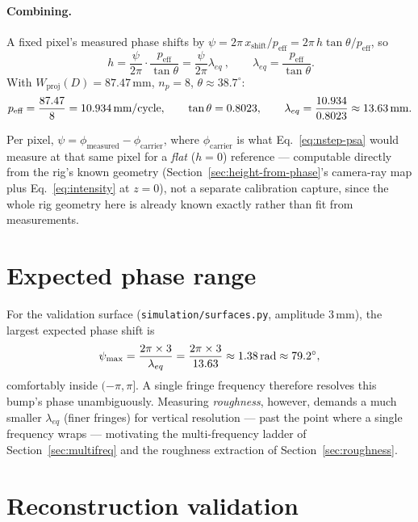 \documentclass[11pt]{article}
\begin{document}
\paragraph{Combining.} A fixed pixel's measured phase shifts by
$\psi = 2\pi\,x_{\text{shift}}/p_{\text{eff}} = 2\pi\,h\tan\theta/p_{\text{eff}}$,
so
\begin{equation}
  \boxed{\ h = \frac{\psi}{2\pi}\cdot\frac{p_{\text{eff}}}{\tan\theta} = \frac{\psi}{2\pi}\lambda_{eq}\ },
  \qquad \lambda_{eq} = \frac{p_{\text{eff}}}{\tan\theta}.
  \label{eq:height-from-phase}
\end{equation}
With $W_{\text{proj}}(D) = 87.47$\,mm, $n_p = 8$, $\theta \approx 38.7^\circ$:
\begin{equation}
  p_{\text{eff}} = \frac{87.47}{8} = 10.934\text{\,mm/cycle}, \qquad
  \tan\theta = 0.8023, \qquad
  \lambda_{eq} = \frac{10.934}{0.8023} \approx 13.63\text{\,mm}.
\end{equation}

Per pixel, $\psi = \phi_{\text{measured}} - \phi_{\text{carrier}}$, where
$\phi_{\text{carrier}}$ is what Eq.~\ref{eq:nstep-psa} would measure at
that same pixel for a \emph{flat} ($h=0$) reference --- computable directly
from the rig's known geometry (Section~\ref{sec:height-from-phase}'s
camera-ray map plus Eq.~\ref{eq:intensity} at $z=0$), not a separate
calibration capture, since the whole rig geometry here is already known
exactly rather than fit from measurements.

\section{Expected phase range}

For the validation surface (\texttt{simulation/surfaces.py}, amplitude
$3$\,mm), the largest expected phase shift is
\begin{equation}
  \psi_{\max} = \frac{2\pi \times 3}{\lambda_{eq}} = \frac{2\pi\times3}{13.63}
  \approx 1.38\text{\,rad} \approx 79.2^\circ,
\end{equation}
comfortably inside $(-\pi,\pi]$. A single fringe frequency therefore
resolves this bump's phase unambiguously. Measuring \emph{roughness},
however, demands a much smaller $\lambda_{eq}$ (finer fringes) for vertical
resolution --- past the point where a single frequency wraps ---
motivating the multi-frequency ladder of
Section~\ref{sec:multifreq} and the roughness extraction of
Section~\ref{sec:roughness}.

\section{Reconstruction validation}
\label{sec:validation}
\end{document}
